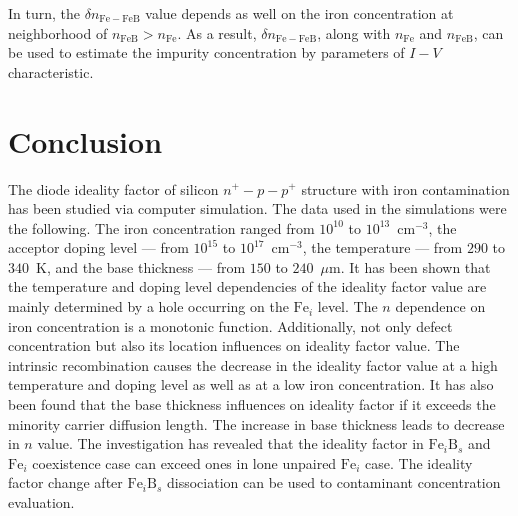 In turn, the $\delta n_\mathrm{Fe-FeB}$ value depends as well on the iron concentration
at neighborhood of $n_\mathrm{FeB}>n_\mathrm{Fe}$.
As a result, $\delta n_\mathrm{Fe-FeB}$, along with $n_\mathrm{Fe}$ and $n_\mathrm{FeB}$,
can be used to estimate the impurity concentration by parameters of $I-V$ characteristic.


\section{Conclusion}

The diode ideality factor of silicon $n^+-p-p^+$ structure with iron contamination has been studied via computer simulation.
The data used in the simulations were the following.
The iron concentration ranged from $10^{10}$ to $10^{13}$~cm$^{-3}$,
the acceptor doping level --- from $10^{15}$ to $10^{17}$~cm$^{-3}$,
the temperature --- from $290$ to $340$~K,
and the base thickness --- from $150$ to $240$~$\mu$m.
It has been shown that the temperature and doping level dependencies of the ideality factor value
are mainly determined by a hole occurring on the $\mathrm{Fe}_i$ level.
The $n$ dependence on iron concentration is a monotonic function.
Additionally, not only defect concentration but also its location influences on  ideality factor value.
The intrinsic recombination causes the decrease in the ideality factor value at a high temperature and doping level as well as at a low iron concentration.
It has also been found that the base thickness influences on ideality factor if it exceeds the minority carrier diffusion length.
The increase in base thickness leads to decrease in $n$ value.
The investigation has revealed that the ideality factor in $\mathrm{Fe}_i\mathrm{B}_s$ and $\mathrm{Fe}_i$ coexistence case
can exceed ones in lone unpaired $\mathrm{Fe}_i$ case.
The ideality factor change after $\mathrm{Fe}_i\mathrm{B}_s$ dissociation can be used to contaminant concentration evaluation.

